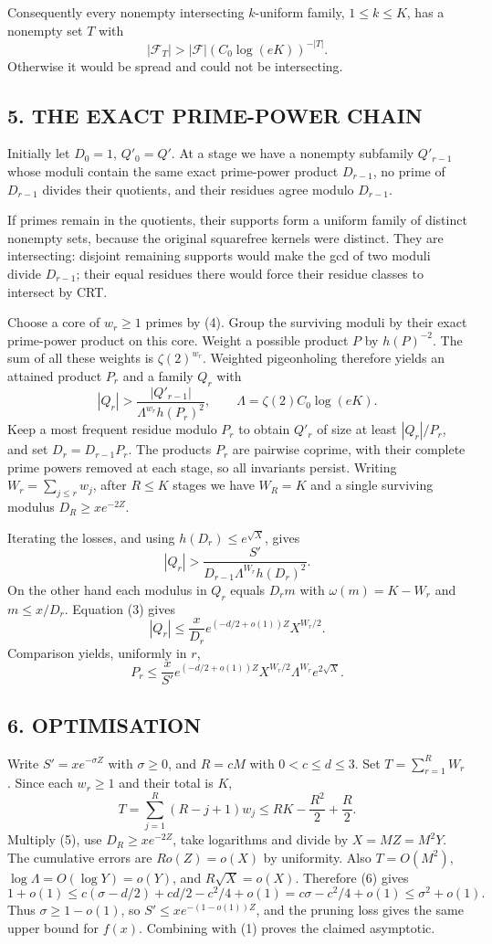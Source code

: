 Consequently every nonempty intersecting $k$-uniform family, $1\le k\le K$, has a nonempty set $T$ with
\[
 |\mathcal F_T|>|\mathcal F|(C_0\log(eK))^{-|T|}.       \tag{4}
\]
Otherwise it would be spread and could not be intersecting.
\subsection*{5. THE EXACT PRIME-POWER CHAIN}
Initially let $D_0=1$, $Q'_0=Q'$. At a stage we have a nonempty subfamily $Q'_{r-1}$ whose moduli contain the same exact prime-power product $D_{r-1}$, no prime of $D_{r-1}$ divides their quotients, and their residues agree modulo $D_{r-1}$.

If primes remain in the quotients, their supports form a uniform family of distinct nonempty sets, because the original squarefree kernels were distinct. They are intersecting: disjoint remaining supports would make the gcd of two moduli divide $D_{r-1}$; their equal residues there would force their residue classes to intersect by CRT.

Choose a core of $w_r\ge1$ primes by (4). Group the surviving moduli by their exact prime-power product on this core. Weight a possible product $P$ by $h(P)^{-2}$. The sum of all these weights is $\zeta(2)^{w_r}$. Weighted pigeonholing therefore yields an attained product $P_r$ and a family $Q_r$ with
\[
 |Q_r|>\frac{|Q'_{r-1}|}{\Lambda^{w_r}h(P_r)^2},\qquad
 \Lambda=\zeta(2)C_0\log(eK).
\]
Keep a most frequent residue modulo $P_r$ to obtain $Q'_r$ of size at least $|Q_r|/P_r$, and set $D_r=D_{r-1}P_r$. The products $P_r$ are pairwise coprime, with their complete prime powers removed at each stage, so all invariants persist. Writing $W_r=\sum_{j\le r}w_j$, after $R\le K$ stages we have $W_R=K$ and a single surviving modulus $D_R\ge xe^{-2Z}$.

Iterating the losses, and using $h(D_r)\le e^{\sqrt X}$, gives
\[
 |Q_r|>\frac{S'}{D_{r-1}\Lambda^{W_r}h(D_r)^2}.
\]
On the other hand each modulus in $Q_r$ equals $D_rm$ with $\omega(m)=K-W_r$ and $m\le x/D_r$. Equation (3) gives
\[
 |Q_r|\le\frac{x}{D_r}e^{(-d/2+o(1))Z}X^{W_r/2}.
\]
Comparison yields, uniformly in $r$,
\[
 P_r\le\frac{x}{S'}e^{(-d/2+o(1))Z}
            X^{W_r/2}\Lambda^{W_r}e^{2\sqrt X}.        \tag{5}
\]
\subsection*{6. OPTIMISATION}
Write $S'=xe^{-\sigma Z}$ with $\sigma\ge0$, and $R=cM$ with $0<c\le d\le3$. Set $T=\sum_{r=1}^R W_r$. Since each $w_r\ge1$ and their total is $K$,
\[
 T=\sum_{j=1}^R(R-j+1)w_j\le RK-\frac{R^2}2+\frac R2. \tag{6}
\]
Multiply (5), use $D_R\ge xe^{-2Z}$, take logarithms and divide by $X=MZ=M^2Y$. The cumulative errors are $Ro(Z)=o(X)$ by uniformity. Also $T=O(M^2)$, $\log\Lambda=O(\log Y)=o(Y)$, and $R\sqrt X=o(X)$. Therefore (6) gives
\[
 1+o(1)\le c(\sigma-d/2)+cd/2-c^2/4+o(1)
 =c\sigma-c^2/4+o(1)\le\sigma^2+o(1).
\]
Thus $\sigma\ge1-o(1)$, so $S'\le xe^{-(1-o(1))Z}$, and the pruning loss gives the same upper bound for $f(x)$. Combining with (1) proves the claimed asymptotic.
